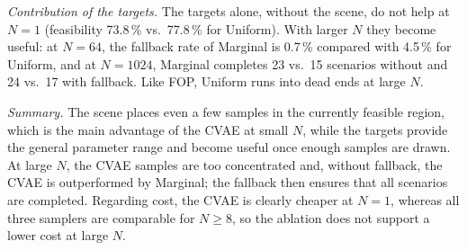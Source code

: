 \textit{Contribution of the targets.}
The targets alone, without the scene, do not help at $N = 1$ (feasibility 73.8\,\% vs.\ 77.8\,\% for Uniform).
With larger $N$ they become useful: at $N = 64$, the fallback rate of Marginal is 0.7\,\% compared with 4.5\,\% for Uniform, and at $N = 1024$, Marginal completes 23 vs.\ 15 scenarios without and 24 vs.\ 17 with fallback.
Like FOP, Uniform runs into dead ends at large $N$.

\textit{Summary.}
The scene places even a few samples in the currently feasible region, which is the main advantage of the CVAE at small $N$, while the targets provide the general parameter range and become useful once enough samples are drawn.
At large $N$, the CVAE samples are too concentrated and, without fallback, the CVAE is outperformed by Marginal; the fallback then ensures that all scenarios are completed.
Regarding cost, the CVAE is clearly cheaper at $N = 1$, whereas all three samplers are comparable for $N \geq 8$, so the ablation does not support a lower cost at large $N$.
